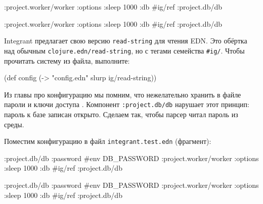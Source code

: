 \ifx\DEVICETYPE\MOBILE

\begin{english}
  \begin{clojure}
{:project.worker/worker
 {:options {:sleep 1000}
  :db #ig/ref :project.db/db}}
  \end{clojure}
\end{english}

\else

\begin{english}
  \begin{clojure}
{:project.worker/worker {:options {:sleep 1000}
                         :db #ig/ref :project.db/db}}
  \end{clojure}
\end{english}

\fi


\mnoindent
Integrant предлагает свою версию \verb|read-string| для чтения EDN. Это обёртка
над обычным \verb|clojure.edn/read-string|, но с тегами семейства
\verb|#ig/|. Чтобы прочитать систему из файла, выполните:

\begin{english}
  \begin{clojure}
(def config
  (-> "config.edn" slurp ig/read-string))
  \end{clojure}
\end{english}


Из главы про конфигурацию мы помним, что нежелательно хранить в файле пароли и
ключи доступа . Компонент \verb|:project.db/db| нарушает
этот принцип: пароль к базе записан открыто. Сделаем так, чтобы парсер читал
пароль из среды.

Поместим конфигурацию в файл \texttt{integrant\-.test.edn} (фрагмент):

\ifx\DEVICETYPE\MOBILE

\begin{english}
  \begin{clojure}
{:project.db/db
 {:password #env DB_PASSWORD}
 :project.worker/worker
 {:options {:sleep 1000}
  :db #ig/ref :project.db/db}}
  \end{clojure}
\end{english}

\else

\begin{english}
  \begin{clojure}
{:project.db/db {:password #env DB_PASSWORD}
 :project.worker/worker {:options {:sleep 1000}
                         :db #ig/ref :project.db/db}}
  \end{clojure}
\end{english}

